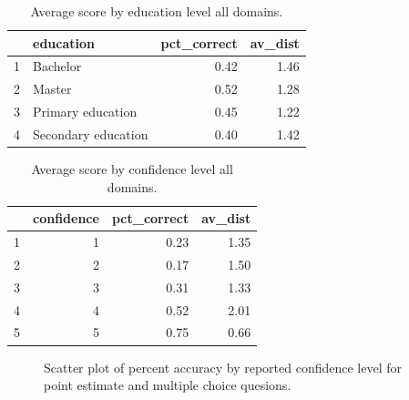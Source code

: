 \documentclass[12pt]{article}
\begin{document}
\begin{table}[ht!]
\centering
\begin{tabular}{rlrr}
  \hline
 & education & pct\_correct & av\_dist \\ 
  \hline
1 & Bachelor & 0.42 & 1.46 \\ 
  2 & Master & 0.52 & 1.28 \\ 
  3 & Primary education & 0.45 & 1.22 \\ 
  4 & Secondary education & 0.40 & 1.42 \\ 
   \hline
\end{tabular}
\caption{Average score by education level all domains.} 
\end{table}


\clearpage

\begin{table}[ht]
\centering
\begin{tabular}{rrrr}
  \hline
 & confidence & pct\_correct & av\_dist \\ 
  \hline
1 &   1 & 0.23 & 1.35 \\ 
  2 &   2 & 0.17 & 1.50 \\ 
  3 &   3 & 0.31 & 1.33 \\ 
  4 &   4 & 0.52 & 2.01 \\ 
  5 &   5 & 0.75 & 0.66 \\ 
   \hline
\end{tabular}
\caption{Average score by confidence level all domains.} 
\end{table}

\begin{figure}[ht!]
     \begin{center}
    \end{center}
    \caption{Scatter plot of percent accuracy by reported confidence level for point estimate and multiple choice quesions. }
\end{figure}
\end{document}
